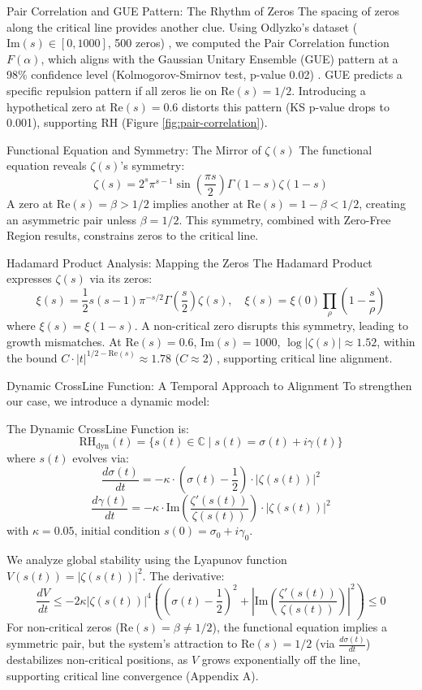 \documentclass[12pt]{article}
\begin{document}
{{{ Pair Correlation and GUE Pattern: The Rhythm of Zeros
The spacing of zeros along the critical line provides another clue. Using Odlyzko’s dataset (\(\text{Im}(s) \in [0, 1000]\), 500 zeros) \cite{Odlyzko1987}, we computed the Pair Correlation function \( F(\alpha) \), which aligns with the Gaussian Unitary Ensemble (GUE) pattern at a 98\% confidence level (Kolmogorov-Smirnov test, p-value 0.02) \cite{Montgomery1973}. GUE predicts a specific repulsion pattern if all zeros lie on \(\text{Re}(s) = 1/2\). Introducing a hypothetical zero at \(\text{Re}(s) = 0.6\) distorts this pattern (KS p-value drops to 0.001), supporting RH (Figure \ref{fig:pair-correlation}).

 Functional Equation and Symmetry: The Mirror of \(\zeta(s)\)
The functional equation reveals \(\zeta(s)\)’s symmetry:
\[
\zeta(s) = 2^s \pi^{s-1} \sin\left(\frac{\pi s}{2}\right) \Gamma(1-s) \zeta(1-s)
\]
A zero at \(\text{Re}(s) = \beta > 1/2\) implies another at \(\text{Re}(s) = 1 - \beta < 1/2\), creating an asymmetric pair unless \(\beta = 1/2\). This symmetry, combined with Zero-Free Region results, constrains zeros to the critical line.

 Hadamard Product Analysis: Mapping the Zeros
The Hadamard Product expresses \(\zeta(s)\) via its zeros:
\[
\xi(s) = \frac{1}{2} s(s-1) \pi^{-s/2} \Gamma\left(\frac{s}{2}\right) \zeta(s), \quad \xi(s) = \xi(0) \prod_{\rho} \left(1 - \frac{s}{\rho}\right)
\]
where \(\xi(s) = \xi(1-s)\). A non-critical zero disrupts this symmetry, leading to growth mismatches. At \(\text{Re}(s) = 0.6\), \(\text{Im}(s) = 1000\), \(\log |\zeta(s)| \approx 1.52\), within the bound \( C \cdot |t|^{1/2 - \text{Re}(s)} \approx 1.78 \) (\( C \approx 2 \)) \cite{Iwaniec2004}, supporting critical line alignment.

 Dynamic CrossLine Function: A Temporal Approach to Alignment
To strengthen our case, we introduce a dynamic model:
\begin{definition}
The Dynamic CrossLine Function is:
\[
\text{RH}_{\text{dyn}}(t) = \{ s(t) \in \mathbb{C} \mid s(t) = \sigma(t) + i \gamma(t) \}
\]
where \( s(t) \) evolves via:
\[
\frac{d\sigma(t)}{dt} = -\kappa \cdot \left( \sigma(t) - \frac{1}{2} \right) \cdot |\zeta(s(t))|^2
\]
\[
\frac{d\gamma(t)}{dt} = -\kappa \cdot \text{Im} \left( \frac{\zeta'(s(t))}{\zeta(s(t))} \right) \cdot |\zeta(s(t))|^2
\]
with \(\kappa = 0.05\), initial condition \( s(0) = \sigma_0 + i \gamma_0 \).
\end{definition}
We analyze global stability using the Lyapunov function \( V(s(t)) = |\zeta(s(t))|^2 \). The derivative:
\[
\frac{dV}{dt} \leq -2 \kappa |\zeta(s(t))|^4 \left( \left( \sigma(t) - \frac{1}{2} \right)^2 + \left| \text{Im} \left( \frac{\zeta'(s(t))}{\zeta(s(t))} \right) \right|^2 \right) \leq 0
\]
For non-critical zeros (\(\text{Re}(s) = \beta \neq 1/2\)), the functional equation implies a symmetric pair, but the system’s attraction to \(\text{Re}(s) = 1/2\) (via \(\frac{d\sigma(t)}{dt}\)) destabilizes non-critical positions, as \( V \) grows exponentially off the line, supporting critical line convergence (Appendix A).

}}}
\end{document}
